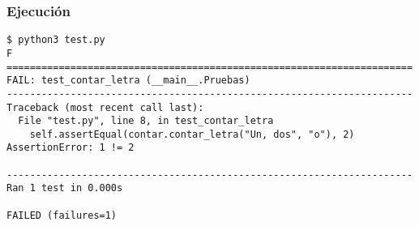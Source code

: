 \begin{frame}[fragile]
\frametitle{Ejecución}

\begin{verbatim}
$ python3 test.py 
F
======================================================================
FAIL: test_contar_letra (__main__.Pruebas)
----------------------------------------------------------------------
Traceback (most recent call last):
  File "test.py", line 8, in test_contar_letra
    self.assertEqual(contar.contar_letra("Un, dos", "o"), 2)
AssertionError: 1 != 2

----------------------------------------------------------------------
Ran 1 test in 0.000s

FAILED (failures=1)
\end{verbatim}

\end{frame}



